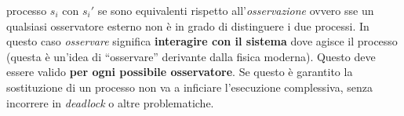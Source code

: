 \begin{itemize}
processo $s_i$ con $s_i'$ se sono equivalenti rispetto
all'\textit{osservazione} ovvero sse un qualsiasi osservatore esterno non è in
grado di distinguere i due processi. In questo caso \textit{osservare} significa
\textbf{interagire con il sistema} dove agisce il processo (questa è un'idea di
``osservare'' derivante dalla fisica moderna). Questo deve essere valido
\textbf{per ogni possibile osservatore}. Se questo è garantito la sostituzione
di un processo non va a inficiare l'esecuzione complessiva, senza incorrere in
\textit{deadlock} o altre problematiche.
\begin{figure}[H]
  \centering

\end{figure}
\end{itemize}
